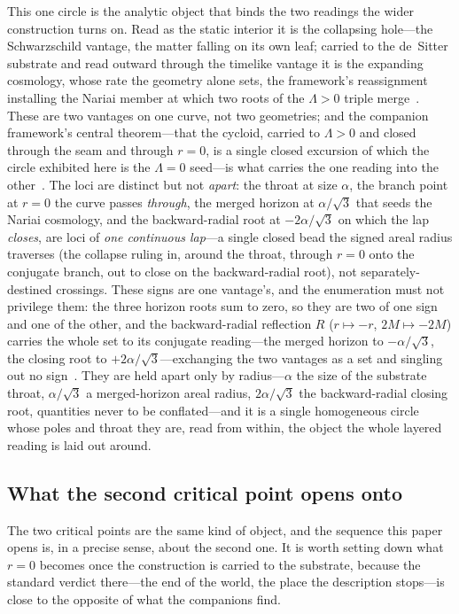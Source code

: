 \documentclass[11pt,a4paper]{article}
\theoremstyle{definition}
\begin{document}
This one circle is the analytic object that binds the two readings the wider construction turns on. Read as the static interior it is the collapsing hole---the Schwarzschild vantage, the matter falling on its own leaf; carried to the de~Sitter substrate and read outward through the timelike vantage it is the expanding cosmology, whose rate the geometry alone sets, the framework's reassignment installing the Nariai member at which two roots of the $\Lambda>0$ triple merge~\cite{JanzenSlicing}. These are two vantages on one curve, not two geometries; and the companion framework's central theorem---that the cycloid, carried to $\Lambda>0$ and closed through the seam and through $r=0$, is a single closed excursion of which the circle exhibited here is the $\Lambda=0$ seed---is what carries the one reading into the other~\cite{JanzenCRframework}. The loci are distinct but not \emph{apart}: the throat at size $\alpha$, the branch point at $r=0$ the curve passes \emph{through}, the merged horizon at $\alpha/\sqrt3$ that seeds the Nariai cosmology, and the backward-radial root at $-2\alpha/\sqrt3$ on which the lap \emph{closes}, are loci of \emph{one continuous lap}---a single closed bead the signed areal radius traverses (the collapse ruling in, around the throat, through $r=0$ onto the conjugate branch, out to close on the backward-radial root), not separately-destined crossings. These signs are one vantage's, and the enumeration must not privilege them: the three horizon roots sum to zero, so they are two of one sign and one of the other, and the backward-radial reflection $R$ ($r\mapsto-r$, $2M\mapsto-2M$) carries the whole set to its conjugate reading---the merged horizon to $-\alpha/\sqrt3$, the closing root to $+2\alpha/\sqrt3$---exchanging the two vantages as a set and singling out no sign~\cite{JanzenSlicing}. They are held apart only by radius---$\alpha$ the size of the substrate throat, $\alpha/\sqrt3$ a merged-horizon areal radius, $2\alpha/\sqrt3$ the backward-radial closing root, quantities never to be conflated---and it is a single homogeneous circle whose poles and throat they are, read from within, the object the whole layered reading is laid out around.

\subsection{What the second critical point opens onto}\label{sec:r0-tee}

The two critical points are the same kind of object, and the sequence this paper opens is, in a precise sense, about the second one. It is worth setting down what $r=0$ becomes once the construction is carried to the substrate, because the standard verdict there---the end of the world, the place the description stops---is close to the opposite of what the companions find.
\end{document}

